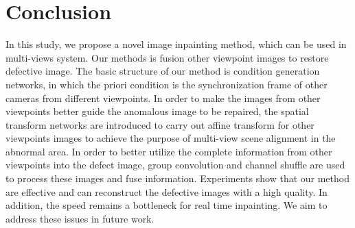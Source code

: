 \documentclass{IEEE_lsens}
\begin{document}
%
%

\section{Conclusion}

In this study, we propose a novel image inpainting method, which can be used in multi-views system. Our methods is fusion other viewpoint images to restore defective image. The basic structure of our method is condition generation networks, in which the priori condition is the synchronization frame of other cameras from different viewpoints.  In order to make the images from other viewpoints better guide the anomalous image to be repaired, the spatial transform networks are introduced to carry out affine transform for other viewpoints images to achieve the purpose of multi-view scene alignment in the abnormal area. In order to better utilize the complete information from other viewpoints into the defect image, group convolution and channel shuffle are used to process these images and fuse information. Experiments show that our method are effective and can reconstruct the defective images with a high quality. In addition, the speed remains a bottleneck for real time inpainting. We aim to address these issues in future work.
\end{document}
